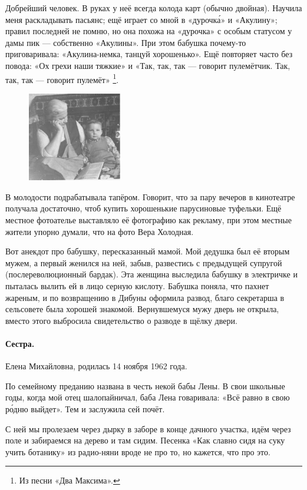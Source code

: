 \documentclass{book}
\begin{document}
Добрейший человек.
В руках у неё всегда колода карт (обычно двойная).
Научила меня раскладывать пасьянс;  ещё играет со мной в «дурочк\'{а}» и
«Акулину»;
правил последней не помню, но она похожа на «дурочка» с особым статусом у дамы пик --- собственно «Акулины».
При этом бабушка почему-то приговаривала: «Акулина-немка, танцуй хорошенько».
Ещё повторяет часто без повода: «Ох грехи наши тяжкие» и «Так, так, так --- говорит пулемётчик. Так, так, так --- говорит пулемёт»%
\footnote{Из песни «Два Максима».}.

\begin{figure}
\vskip-4mm
\centering
\includegraphics[width=41mm,angle=0]{pics/baba-lyusya-tosha}
\end{figure}

В молодости подрабатывала тапёром.
Говорит, что за пару вечеров в кинотеатре получала достаточно, чтоб купить хорошенькие парусиновые туфельки.
Ещё местное фотоателье выставляло её фотографию как рекламу, при этом местные жители упорно думали, что на фото Вера Холодная.

Вот анекдот про бабушку, пересказанный мамой.
Мой дедушка был её вторым мужем, а первый женился на ней, забыв, развестись с предыдущей супругой (послереволюционный бардак).
Эта женщина выследила бабушку в электричке и пыталась вылить ей в лицо серную кислоту.
Бабушка поняла, что пахнет жареным, и по возвращению в Дибуны оформила развод, благо секретарша в сельсовете была хорошей знакомой.
Вернувшемуся мужу дверь не открыла, вместо этого выбросила свидетельство о разводе в щёлку двери.

\paragraph{Сестра.} Елена Михайловна, родилась 14 ноября 1962 года.

По семейному преданию названа в честь некой бабы Лены.
В свои школьные годы,
когда мой отец шалопайничал,
баба Лена говаривала: «Всё равно в свою р\'{о}дню выйдет».
Тем и заслужила сей почёт.

С ней мы пролезаем через дырку в заборе в конце дачного участка, идём через поле и забираемся на дерево и там сидим.
Песенка «Как славно сидя на суку учить ботанику» из радио-няни вроде не про то, но кажется, что про это.
\end{document}
